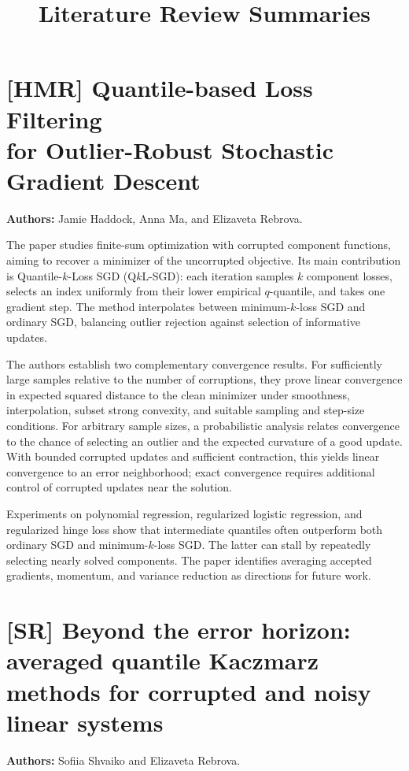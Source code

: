 \documentclass[11pt]{article}
\title{Literature Review Summaries}
\author{}
\date{}
\begin{document}
\maketitle

\section{[HMR] Quantile-based Loss Filtering\\for Outlier-Robust Stochastic Gradient Descent}
\label{sec:hmr}
\textbf{Authors:} Jamie Haddock, Anna Ma, and Elizaveta Rebrova.

The paper studies finite-sum optimization with corrupted component functions,
aiming to recover a minimizer of the uncorrupted objective. Its main
contribution is Quantile-$k$-Loss SGD (Q$k$L-SGD): each iteration samples $k$
component losses, selects an index uniformly from their lower empirical
$q$-quantile, and takes one gradient step. The method interpolates between
minimum-$k$-loss SGD and ordinary SGD, balancing outlier rejection against
selection of informative updates.

The authors establish two complementary convergence results. For sufficiently
large samples relative to the number of corruptions, they prove linear
convergence in expected squared distance to the clean minimizer under
smoothness, interpolation, subset strong convexity, and suitable sampling and
step-size conditions. For arbitrary sample sizes, a probabilistic analysis
relates convergence to the chance of selecting an outlier and the expected
curvature of a good update. With bounded corrupted updates and sufficient
contraction, this yields linear convergence to an error neighborhood; exact
convergence requires additional control of corrupted updates near the solution.

Experiments on polynomial regression, regularized logistic regression, and
regularized hinge loss show that intermediate quantiles often outperform
both ordinary SGD and minimum-$k$-loss SGD. The latter can stall by repeatedly
selecting nearly solved components. The paper identifies averaging accepted
gradients, momentum, and variance reduction as directions for future work.


\section{[SR] Beyond the error horizon: averaged quantile Kaczmarz methods for corrupted and noisy linear systems}
\label{sec:sr}
\textbf{Authors:} Sofiia Shvaiko and Elizaveta Rebrova.
\end{document}
